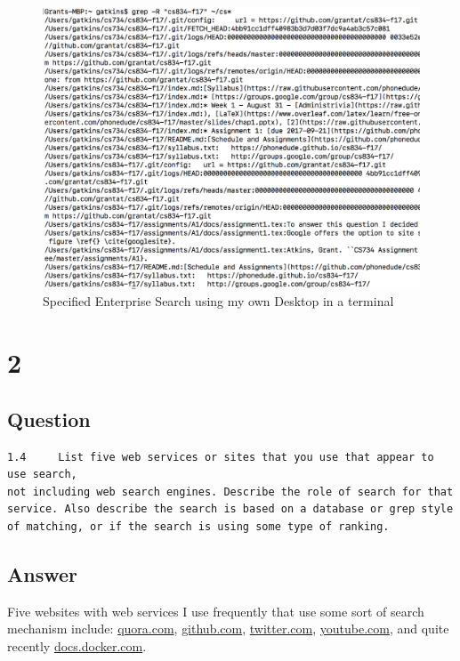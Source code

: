 \documentclass[letterpaper,11pt]{article}
\begin{document}
  \begin{figure}[h]
  \centering
  \includegraphics[scale=0.35]{grepsearch.png}
  \caption{Specified Enterprise Search using my own Desktop in a terminal}
  \label{fig:esearch2}
  \end{figure}


\clearpage


\section*{2}

\subsection*{Question}

\begin{verbatim}
1.4 	List five web services or sites that you use that appear to use search, 
not including web search engines. Describe the role of search for that 
service. Also describe the search is based on a database or grep style
of matching, or if the search is using some type of ranking.
\end{verbatim}

\subsection*{Answer}

Five websites with web services I use frequently that use some sort of search mechanism include: \url{quora.com}, \url{github.com}, \url{twitter.com}, \url{youtube.com}, and quite recently \url{docs.docker.com}.
\end{document}
